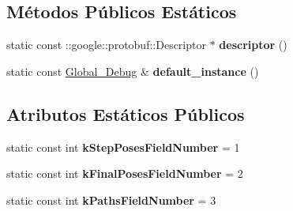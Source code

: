\subsection*{Métodos Públicos Estáticos}
\begin{DoxyCompactItemize}
\item 
static const \+::google\+::protobuf\+::\+Descriptor $\ast$ {\bfseries descriptor} ()\hypertarget{classvss__debug_1_1Global__Debug_a53c6140b0471107b26e4f9566e304a0e}{}\label{classvss__debug_1_1Global__Debug_a53c6140b0471107b26e4f9566e304a0e}

\item 
static const \hyperlink{classvss__debug_1_1Global__Debug}{Global\+\_\+\+Debug} \& {\bfseries default\+\_\+instance} ()\hypertarget{classvss__debug_1_1Global__Debug_a14f064b25ff8c739456a80d070ea984d}{}\label{classvss__debug_1_1Global__Debug_a14f064b25ff8c739456a80d070ea984d}

\end{DoxyCompactItemize}
\subsection*{Atributos Estáticos Públicos}
\begin{DoxyCompactItemize}
\item 
static const int {\bfseries k\+Step\+Poses\+Field\+Number} = 1\hypertarget{classvss__debug_1_1Global__Debug_a2df9b6dfc67d1247a6e2cc14816e9555}{}\label{classvss__debug_1_1Global__Debug_a2df9b6dfc67d1247a6e2cc14816e9555}

\item 
static const int {\bfseries k\+Final\+Poses\+Field\+Number} = 2\hypertarget{classvss__debug_1_1Global__Debug_aa70951505a61cd29c7ae7f253d989dff}{}\label{classvss__debug_1_1Global__Debug_aa70951505a61cd29c7ae7f253d989dff}

\item 
static const int {\bfseries k\+Paths\+Field\+Number} = 3\hypertarget{classvss__debug_1_1Global__Debug_a6e038a00c8908826357fc9f017215e3a}{}\label{classvss__debug_1_1Global__Debug_a6e038a00c8908826357fc9f017215e3a}

\end{DoxyCompactItemize}
